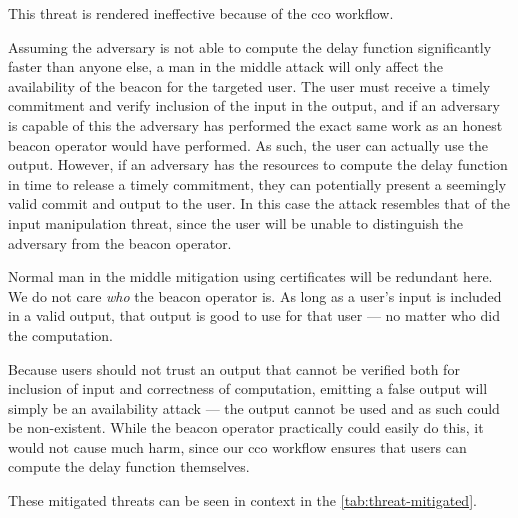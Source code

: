 This threat is rendered ineffective because of the \gls{cco} workflow.

Assuming the adversary is not able to compute the delay function significantly faster than anyone else, a man in the middle attack will only affect the availability of the beacon for the targeted user.
The user must receive a timely commitment and verify inclusion of the input in the output, and if an adversary is capable of this the adversary has performed the exact same work as an honest beacon operator would have performed.
As such, the user can actually use the output.
However, if an adversary has the resources to compute the delay function in time to release a timely commitment, they can potentially present a seemingly valid commit and output to the user.
In this case the attack resembles that of the input manipulation threat, since the user will be unable to distinguish the adversary from the beacon operator.

Normal man in the middle mitigation using certificates will be redundant here.
We do not care \emph{who} the beacon operator is.
As long as a user's input is included in a valid output, that output is good to use for that user --- no matter who did the computation.

Because users should not trust an output that cannot be verified both for inclusion of input and correctness of computation, emitting a false output will simply be an availability attack --- the output cannot be used and as such could be non-existent.
While the beacon operator practically could easily do this, it would not cause much harm, since our \gls{cco} workflow ensures that users can compute the delay function themselves.


\bigskip
These mitigated threats can be seen in context in the \cref{tab:threat-mitigated}.

